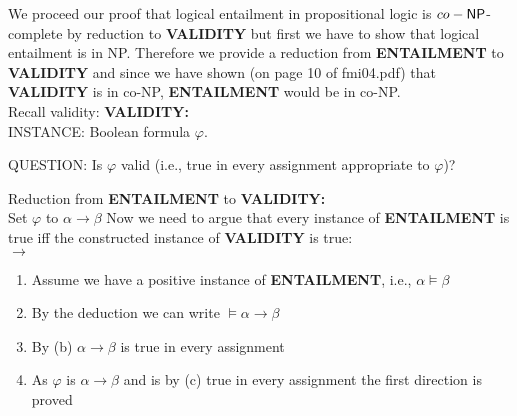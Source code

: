 \documentclass [11pt]{article}
\newcommand{\ccfont}[1]{\protect\mathsf{#1}}
\newcommand{\NP}{\ccfont{NP}}
\newcommand{\solution}[1]{\noindent {\bf Solution.}  #1}
\begin{document}
\solution{  
  We proceed our proof that logical entailment in propositional logic is $co-\NP$-complete by reduction to \textbf{VALIDITY} but first we have to show that 
  logical entailment is in NP.
  Therefore we provide a reduction from \textbf{ENTAILMENT} to \textbf{VALIDITY} and since we have shown (on page 10 of fmi04.pdf) that \textbf{VALIDITY} is in co-NP, \textbf{ENTAILMENT} would be
  in co-NP.\\
  Recall validity:
  \medskip
  \noindent 
  \textbf{VALIDITY: } \\
  \noindent 
  INSTANCE: Boolean formula $\varphi$. 

  \noindent 
  QUESTION: Is $\varphi$ valid (i.e., true in every assignment appropriate to $\varphi$)?
  \medskip
  \noindent 

  \noindent 
  Reduction from \textbf{ENTAILMENT} to \textbf{VALIDITY:}\\
  Set $\varphi$ to $\alpha \rightarrow \beta$
  Now we need to argue that every instance of \textbf{ENTAILMENT} is true iff the constructed instance of \textbf{VALIDITY} is true:\\

  $\rightarrow$
  \begin{enumerate}
    \item{Assume we have a positive instance of \textbf{ENTAILMENT}, i.e., $\alpha \models \beta$}
    \item{By the deduction we can write $\models \alpha \rightarrow \beta$}
    \item{By (b) $\alpha \rightarrow \beta$ is true in every assignment}
    \item{As $\varphi$ is $\alpha \rightarrow \beta$ and is by (c) true in every assignment the first direction is proved}
    
  \end{enumerate}
  
}
\end{document}

